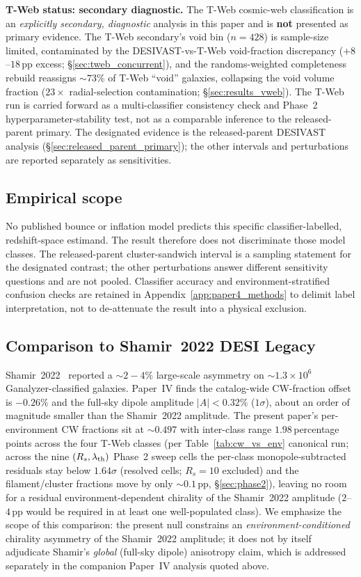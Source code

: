 \documentclass[aps,prd,twocolumn,superscriptaddress,showpacs,preprintnumbers,nofootinbib,longbibliography,floatfix]{revtex4-2}
\begin{document}
\textbf{T-Web status: secondary diagnostic.} The T-Web
cosmic-web classification is an \emph{explicitly secondary, diagnostic}
analysis in this paper and is \textbf{not} presented as primary
evidence. The T-Web
secondary's void bin ($n=428$) is sample-size limited, contaminated by
the DESIVAST-vs-T-Web void-fraction discrepancy ($+8$--$18$\,pp excess;
\S\ref{sec:tweb_concurrent}), and the randoms-weighted completeness
rebuild reassigns ${\sim}73\%$ of T-Web ``void'' galaxies, collapsing
the void volume fraction ($23\times$ radial-selection contamination;
\S\ref{sec:results_vweb}). The T-Web run is carried forward as a
multi-classifier consistency check and Phase~2 hyperparameter-stability
test, not as a comparable inference to the released-parent primary.
The designated evidence is the released-parent DESIVAST analysis
(\S\ref{sec:released_parent_primary}); the other intervals and
perturbations are reported separately as sensitivities.

\subsection{Empirical scope}

No published bounce or inflation model predicts this specific
classifier-labelled, redshift-space estimand. The result therefore does
not discriminate those model classes. The released-parent
cluster-sandwich interval is a sampling statement for the designated
contrast; the other perturbations answer different sensitivity
questions and are not pooled. Classifier accuracy and
environment-stratified confusion checks are retained in
Appendix~\ref{app:paper4_methods} to delimit label interpretation, not to
de-attenuate the result into a physical exclusion.

\subsection{Comparison to Shamir~2022 DESI Legacy}

Shamir~2022~\cite{Shamir2022DESI} reported a $\sim 2\!-\!4\%$
large-scale asymmetry on $\sim\!1.3\!\times\!10^6$ Ganalyzer-classified
galaxies. Paper~IV finds the catalog-wide CW-fraction offset is
$-0.26\%$ and the full-sky dipole amplitude $|A|\!<\!0.32\%$
($1\sigma$), about an order of magnitude smaller than the Shamir~2022
amplitude. The present paper's per-environment CW fractions sit at
$\sim 0.497$ with inter-class range $1.98$\,percentage points across the four
T-Web classes (per Table~\ref{tab:cw_vs_env} canonical run; across
the nine $(R_s, \lambda_{\rm th})$ Phase~2
sweep cells the per-class monopole-subtracted residuals stay below
$1.64\sigma$ (resolved cells; $R_s\!=\!10$ excluded) and the filament/cluster fractions move by
only ${\sim}0.1$\,pp, \S\ref{sec:phase2}), leaving no room
for a residual environment-dependent chirality of the Shamir~2022
amplitude ($2$--$4$\,pp would be required in at least one well-populated
class). We emphasize the scope of this comparison: the present null
constrains an \emph{environment-conditioned} chirality asymmetry of
the Shamir~2022 amplitude; it does not by itself adjudicate
Shamir's \emph{global} (full-sky dipole) anisotropy claim, which is
addressed separately in the companion Paper~IV analysis quoted above.
\end{document}
